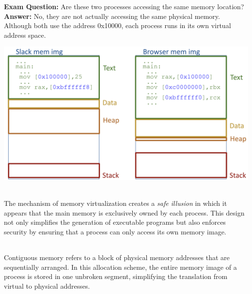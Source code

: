 \documentclass[../../compsys.tex]{subfiles}
\begin{document}
\noindent
\begin{minipage}{0.45\textwidth}
\textbf{Exam Question:} Are these two processes accessing the same memory location? \\[3px]
\textbf{Answer:} No, they are not actually accessing the same physical memory. Although both use the address 0x10000, each process runs in its own virtual address space. 
\end{minipage}%
\hfill
\vline
\hfill
\begin{minipage}{0.45\textwidth}
\begin{center}
    \includegraphics[width=1.25\textwidth]{chapters/L4/images/virtual.png}
\end{center}
\end{minipage}\\[14px]

The mechanism of memory virtualization creates a \emph{safe illusion} in which it appears that the main memory is exclusively owned by each process. This design not only simplifies the generation of executable programs but also enforces security by ensuring that a process can only access its own memory image.

\begin{definition}
\leavevmode\\[2px]
Contiguous memory refers to a block of physical memory addresses that are sequentially arranged. In this allocation scheme, the entire memory image of a process is stored in one unbroken segment, simplifying the translation from virtual to physical addresses.
\end{definition}
\end{document}
